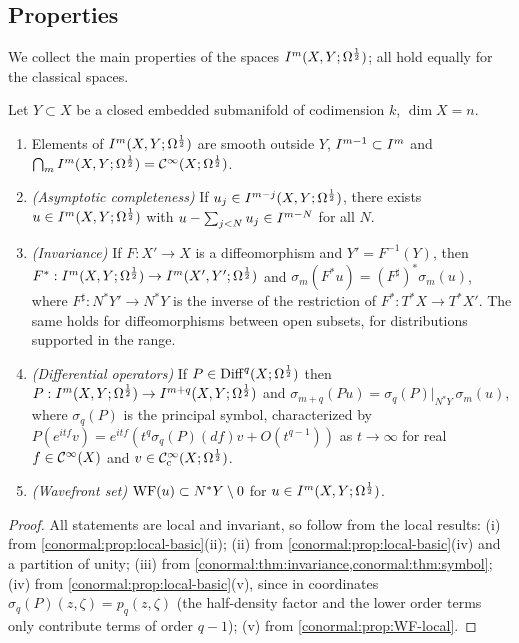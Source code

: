 \subsection{Properties}
We collect the main properties of the spaces $I^{m}(X,Y;\Omega^{\frac12})$; all hold
equally for the classical spaces.

\begin{theorem}\label{conormal:thm:properties}
  Let $Y\subset X$ be a closed embedded submanifold of codimension $k$, $\dim
  X=n$.
  \begin{enumerate}[label=(\roman*)]
  \item Elements of $I^{m}(X,Y;\Omega^{\frac12})$ are smooth outside $Y$,
    $I^{m-1}\subset I^{m}$ and $\bigcap_mI^{m}(X,Y;\Omega^{\frac12})=\mathcal{C}^\infty(X;\Omega^{\frac12})$.
  \item \emph{(Asymptotic completeness)} If $u_j\in I^{m-j}(X,Y;\Omega^{\frac12})$, there
    exists $u\in I^{m}(X,Y;\Omega^{\frac12})$ with $u-\sum_{j<N}u_j\in I^{m-N}$ for all $N$.
  \item \emph{(Invariance)} If $F:X'\to X$ is a diffeomorphism and
    $Y'=F^{-1}(Y)$, then $F^*:I^{m}(X,Y;\Omega^{\frac12})\to I^{m}(X',Y';\Omega^{\frac12})$ and
    $\sigma_m(F^*u)=(F^\sharp)^*\sigma_m(u)$, where $F^\sharp:N^*Y'\to N^*Y$ is the
    inverse of the restriction of $F^*:T^*X\to T^*X'$.  The same holds for
    diffeomorphisms between open subsets, for distributions supported in the
    range.
  \item \emph{(Differential operators)} If $P\in\operatorname{Diff}^{q}(X;\Omega^{\frac12})$ then
    $P:I^{m}(X,Y;\Omega^{\frac12})\to I^{m+q}(X,Y;\Omega^{\frac12})$ and
    $\sigma_{m+q}(Pu)=\sigma_q(P)|_{N^*Y}\,\sigma_m(u)$, where $\sigma_q(P)$ is the
    principal symbol, characterized by $P(e^{itf}v)=e^{itf}(t^q\sigma_q(P)(df)v
    +O(t^{q-1}))$ as $t\to\infty$ for real $f\in\mathcal{C}^\infty(X)$ and
    $v\in\mathcal{C}^\infty_{\mathrm{c}}(X;\Omega^{\frac12})$.
  \item \emph{(Wavefront set)} $\operatorname{WF}(u)\subset N^*Y\setminus0$ for
    $u\in I^{m}(X,Y;\Omega^{\frac12})$.
  \end{enumerate}
\end{theorem}
\begin{proof}
  All statements are local and invariant, so follow from the local results:
  (i) from \cref{conormal:prop:local-basic}(ii); (ii) from
  \cref{conormal:prop:local-basic}(iv) and a partition of unity; (iii) from
  \cref{conormal:thm:invariance,conormal:thm:symbol}; (iv) from
  \cref{conormal:prop:local-basic}(v), since in coordinates
  $\sigma_q(P)(z,\zeta)=p_q(z,\zeta)$ (the half-density factor and the lower order
  terms only contribute terms of order $q-1$); (v) from
  \cref{conormal:prop:WF-local}.
\end{proof}

